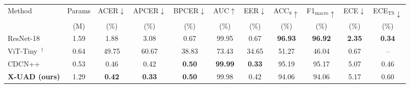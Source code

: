 \begin{tabular}{lcccccccccc}
\toprule
Method & Params & ACER$\downarrow$ & APCER$\downarrow$ & BPCER$\downarrow$ & AUC$\uparrow$ & EER$\downarrow$ & ACC$_8\uparrow$ & F1$_{\text{macro}}\uparrow$ & ECE$\downarrow$ & ECE$_{\text{TS}}\downarrow$ \\
 & (M) & (\%) & (\%) & (\%) & (\%) & (\%) & (\%) & (\%) & (\%) & (\%) \\
\midrule
ResNet-18~\cite{he2016resnet} & 1.59 & 1.88 & 3.08 & 0.67 & 99.95 & 0.67 & \textbf{96.93} & \textbf{96.92} & \textbf{2.35} & \textbf{0.34} \\
ViT-Tiny~\cite{dosovitskiy2021vit}$^{\dagger}$ & 0.64 & 49.75 & 60.67 & 38.83 & 73.43 & 34.65 & 51.27 & 46.04 & 0.67 & -- \\
CDCN++~\cite{yu2020cdcn} & 0.53 & 0.46 & 0.42 & \textbf{0.50} & \textbf{99.99} & \textbf{0.33} & 95.19 & 95.17 & 5.07 & 0.46 \\
\textbf{X-UAD (ours)} & 1.29 & \textbf{0.42} & \textbf{0.33} & \textbf{0.50} & 99.98 & 0.42 & 94.06 & 94.06 & 5.17 & 0.60 \\
\bottomrule
\end{tabular}
